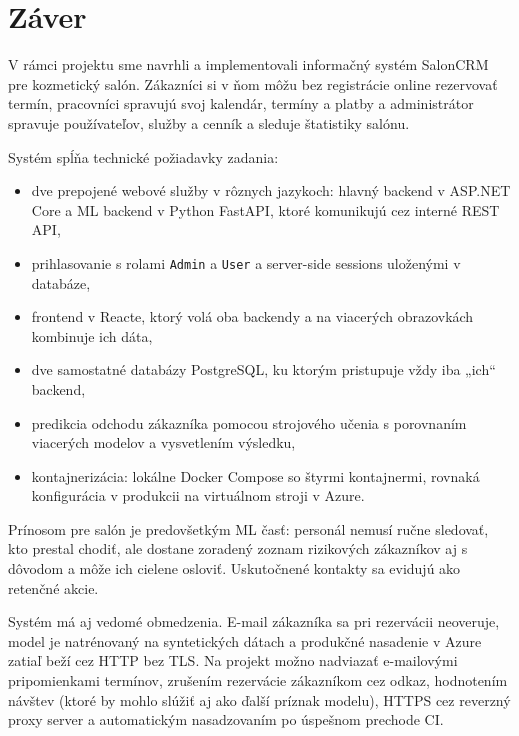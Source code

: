 
\chapter{Záver}\label{ch:conclusion}

V rámci projektu sme navrhli a implementovali informačný systém SalonCRM pre kozmetický salón. Zákazníci si v ňom môžu bez registrácie online rezervovať termín, pracovníci spravujú svoj kalendár, termíny a platby a administrátor spravuje používateľov, služby a cenník a sleduje štatistiky salónu.

Systém spĺňa technické požiadavky zadania:

\begin{itemize}
  \item dve prepojené webové služby v rôznych jazykoch: hlavný backend v ASP.NET Core a ML backend v Python FastAPI, ktoré komunikujú cez interné REST API,
  \item prihlasovanie s rolami \texttt{Admin} a \texttt{User} a server-side sessions uloženými v databáze,
  \item frontend v Reacte, ktorý volá oba backendy a na viacerých obrazovkách kombinuje ich dáta,
  \item dve samostatné databázy PostgreSQL, ku ktorým pristupuje vždy iba „ich“ backend,
  \item predikcia odchodu zákazníka pomocou strojového učenia s porovnaním viacerých modelov a vysvetlením výsledku,
  \item kontajnerizácia: lokálne Docker Compose so štyrmi kontajnermi, rovnaká konfigurácia v produkcii na virtuálnom stroji v Azure.
\end{itemize}

Prínosom pre salón je predovšetkým ML časť: personál nemusí ručne sledovať, kto prestal chodiť, ale dostane zoradený zoznam rizikových zákazníkov aj s dôvodom a môže ich cielene osloviť. Uskutočnené kontakty sa evidujú ako retenčné akcie.

Systém má aj vedomé obmedzenia. E-mail zákazníka sa pri rezervácii neoveruje, model je natrénovaný na syntetických dátach a produkčné nasadenie v Azure zatiaľ beží cez HTTP bez TLS. Na projekt možno nadviazať e-mailovými pripomienkami termínov, zrušením rezervácie zákazníkom cez odkaz, hodnotením návštev (ktoré by mohlo slúžiť aj ako ďalší príznak modelu), HTTPS cez reverzný proxy server a automatickým nasadzovaním po úspešnom prechode CI.
